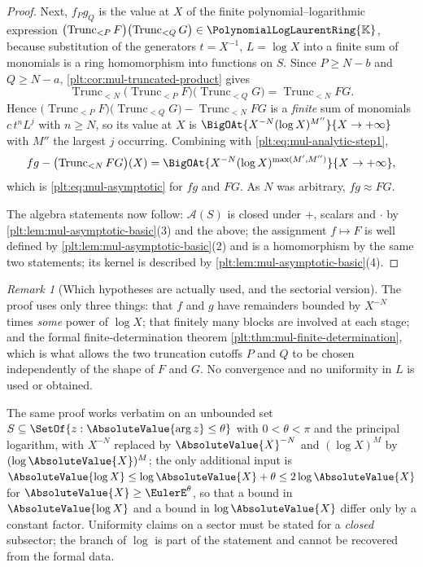 \documentclass[11pt,oneside]{article}
\theoremstyle{plain}
\theoremstyle{definition}
\theoremstyle{remark}
\newtheorem{remark}[theorem]{Remark}
\newcommand{\K}{\mathbb{K}}
\newcommand{\PLlau}{\PolynomialLogLaurentRing{\K}}       %
\newcommand{\Trunc}[2]{\operatorname{Trunc}_{<#2}#1}     %
\begin{document}
\begin{proof}
Next, $f_Pg_Q$ is the value at $X$ of the finite polynomial--logarithmic
expression $\bigl(\Trunc{F}{P}\bigr)\bigl(\Trunc{G}{Q}\bigr)\in\PLlau$,
because substitution of the generators $t=X^{-1}$, $L=\log X$ into a finite
sum of monomials is a ring homomorphism into functions on $S$.  Since
$P\ge N-b$ and $Q\ge N-a$, \cref{plt:cor:mul-truncated-product} gives
\[
 \Trunc{\bigl(\Trunc{F}{P}\bigr)\bigl(\Trunc{G}{Q}\bigr)}{N}
 =\Trunc{FG}{N}.
\]
Hence $\bigl(\Trunc{F}{P}\bigr)\bigl(\Trunc{G}{Q}\bigr)-\Trunc{FG}{N}$ is a
\emph{finite} sum of monomials $c\,t^nL^j$ with $n\ge N$, so its value at
$X$ is $\BigOAt{X^{-N}(\log X)^{M''}}{X\to+\infty}$ with $M''$ the largest
$j$ occurring.  Combining with \eqref{plt:eq:mul-analytic-step1},
\[
 fg-\bigl(\Trunc{FG}{N}\bigr)(X)
 =\BigOAt{X^{-N}(\log X)^{\max(M',M'')}}{X\to+\infty},
\]
which is \eqref{plt:eq:mul-asymptotic} for $fg$ and $FG$.  As $N$ was
arbitrary, $fg\approx FG$.

The algebra statements now follow: $\mathcal A(S)$ is closed under $+$,
scalars and $\cdot$ by \cref{plt:lem:mul-asymptotic-basic}(3) and the above;
the assignment $f\mapsto F$ is well defined by
\cref{plt:lem:mul-asymptotic-basic}(2) and is a homomorphism by the same two
statements; its kernel is described by
\cref{plt:lem:mul-asymptotic-basic}(4).
\end{proof}

\begin{remark}[Which hypotheses are actually used, and the sectorial version]
\label{plt:rmk:mul-analytic-hypotheses}
The proof uses only three things: that $f$ and $g$ have remainders bounded by
$X^{-N}$ times \emph{some} power of $\log X$; that finitely many blocks are
involved at each stage; and the formal finite-determination theorem
\cref{plt:thm:mul-finite-determination}, which is what allows the two
truncation cutoffs $P$ and $Q$ to be chosen independently of the shape of
$F$ and $G$.  No convergence and no uniformity in $L$ is used or obtained.

The same proof works verbatim on an unbounded set
$S\subseteq\SetOf{z:\AbsoluteValue{\arg z}\le\theta}$ with
$0<\theta<\pi$ and the principal logarithm, with $X^{-N}$ replaced by
$\AbsoluteValue{X}^{-N}$ and $(\log X)^{M}$ by
$(\log\AbsoluteValue{X})^{M}$; the only additional input is
$\AbsoluteValue{\log X}\le\log\AbsoluteValue{X}+\theta
\le2\log\AbsoluteValue{X}$ for $\AbsoluteValue{X}\ge\EulerE^{\theta}$, so
that a bound in $\AbsoluteValue{\log X}$ and a bound in
$\log\AbsoluteValue{X}$ differ only by a constant factor.  Uniformity claims
on a sector must be stated for a \emph{closed} subsector; the branch of
$\log$ is part of the statement and cannot be recovered from the formal
data.
\end{remark}
\end{document}
